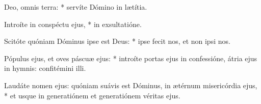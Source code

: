 \begin{psalmus}

 Deo, omnis terra: * servíte Dómino in lætítia.

Introíte in conspéctu ejus, * in exsultatióne.

Scitóte quóniam Dóminus ipse est Deus: * ipse fecit nos, et non ipsi nos.

Pópulus ejus, et oves páscuæ ejus: * introíte portas ejus in confessióne, átria ejus in hymnis: confitémini illi.

Laudáte nomen ejus: quóniam suávis est Dóminus, in ætérnum misericórdia ejus, * et usque in generatiónem et generatiónem véritas ejus.

\end{psalmus}

